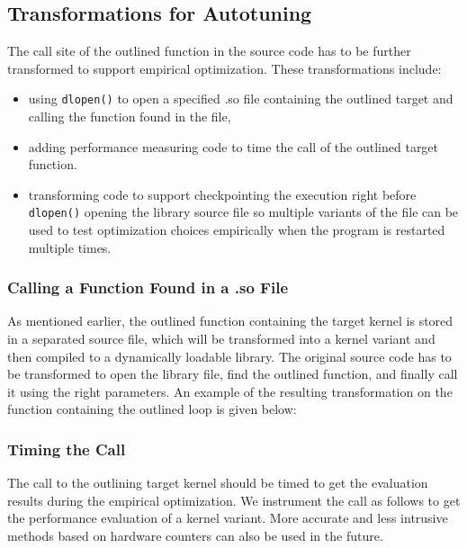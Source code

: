 \subsection{Transformations for Autotuning}
The call site of the outlined function in the source code has to be further transformed to support empirical optimization. 
These transformations include:
\begin{itemize}
\item using \lstinline{dlopen()} to open a specified .so file containing
the outlined target and calling the function found in the file,
\item adding performance measuring code to time the call of the outlined target function.
\item transforming code to support checkpointing the execution right before
\lstinline{dlopen()} opening the library source file so multiple variants of the file can be used to test optimization choices empirically when the program is restarted multiple times.
\end{itemize}
\subsubsection{Calling a Function Found in a .so File}
As mentioned earlier, the outlined function containing the target kernel is
stored in a separated source file, which will be transformed into a kernel variant
and then compiled to a dynamically loadable library. 
The original source code has to be transformed to open the library file,
find the outlined function, and finally call it using the right
parameters. An example of the resulting transformation on the function containing the
outlined loop is given below:


\subsubsection{Timing the Call}
The call to the outlining target kernel should be timed to get the
evaluation results during the empirical optimization. 
We instrument the call as follows to get the performance evaluation of a
kernel variant. 
More accurate and less intrusive methods based on hardware
counters can also be used in the future. 

